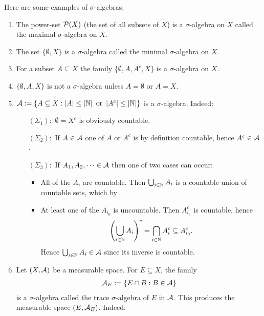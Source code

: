 \documentclass[../../textbook.tex]{subfiles}
\begin{document}
\begin{example}
Here are some examples of $\sigma$-algebras.
\begin{enumerate}
\item The power-set $\mathcal{P}(X)$ (the set of all subsets of $X$) is a $\sigma$-algebra on $X$ called the maximal $\sigma$-algebra on $X$.
\item The set $\{\emptyset, X\}$ is a $\sigma$-algebra called the minimal $\sigma$-algebra on $X$.
\item For a subset $A\subseteq X$ the family $\{\emptyset, A, A^c, X\}$ is a $\sigma$-algebra on $X$.
\item $\{\emptyset, A, X\}$ is not a $\sigma$-algebra unless $A=\emptyset$ or $A=X$.
\item $\mathcal{A}:=\{A \subseteq X : \left|A\right| \le \left|\mathbb{N}\right| \text{ or } \left|A^c\right| \le \left|\mathbb{N}\right| \}$ is a $\sigma$-algebra. Indeed:
\begin{itemize}
    \item[$(\Sigma_1):$] $\emptyset=X^c$ is obviously countable.
    \item[$(\Sigma_2):$] If $A\in \mathcal{A}$ one of $A$ or $A^c$ is by definition countable, hence $A^c\in \mathcal{A}$.
    \item[$(\Sigma_3):$] If $A_1, A_2, \dots \in \mathcal{A}$ then one of two cases can occur:
\begin{itemize}
    \item All of the $A_i$ are countable. Then $\bigcup_{i\in \mathbb{N}}A_i$ is a countable union of countable sets, which by %
    \item At least one of the $A_{i_0}$ is uncountable. Then $A_{i_0}^c$ is countable, hence
    \begin{align*} %
        \left( \bigcup_{i\in \N} A_i \right)^c = \bigcap_{i\in \N} A_i^c \subseteq A_{i_0}^c.
    \end{align*}
    Hence $\bigcup_{i\in \mathbb{N}} A_i\in \mathcal{A}$ since its inverse is countable. 
\end{itemize}
\end{itemize} %
\item Let $(X, \mathcal{A})$ be a measurable space. For $E\subseteq X$, the family
\begin{align*}
    \mathcal{A}_E:=\{E\cap B : B\in \mathcal{A}\}
\end{align*}
is a $\sigma$-algebra called the trace $\sigma$-algebra of $E$ in $\mathcal{A}$. This produces the measurable space $(E, \mathcal{A}_E)$. Indeed:
\begin{itemize}

\end{itemize}
\end{enumerate}
\end{example}
\end{document}
